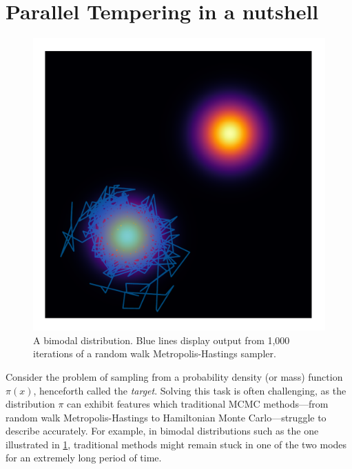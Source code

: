 \section{Parallel Tempering in a nutshell}

\begin{figure}[t]
  \centering
    \includegraphics[width=0.5\linewidth]{../img/bimodal.pdf}
    \caption{A bimodal distribution. Blue lines display output 
    from 1,000 iterations of a random walk Metropolis-Hastings sampler.}
    \label{fig:bimodal}
\end{figure}

Consider the problem of sampling from a probability density (or mass) function
$\pi(x)$, henceforth called the \emph{target}. Solving this task is often 
challenging, as the 
distribution $\pi$ can exhibit features which traditional MCMC methods---from
random walk Metropolis-Hastings to Hamiltonian Monte Carlo---struggle to
describe accurately. For example, in bimodal distributions such as the one 
illustrated in \cref{fig:bimodal}, traditional methods might remain stuck in one 
of the two modes for an extremely long period of time.

